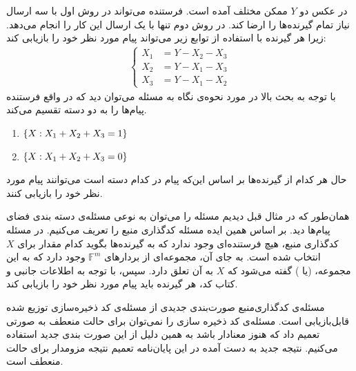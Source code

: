 \begin{example}
\begin{minipage}{0.5\textwidth}
	\end{minipage}
	\newline
	 در عکس دو $Y$ ممکن مختلف آمده است. فرستنده می‌تواند در روش اول با سه ارسال نیاز تمام گیرنده‌ها را ارضا کند. در روش دوم تنها با یک ارسال این کار را انجام می‌دهد. زیرا هر گیرنده با استفاده از توابع زیر می‌تواند پیام مورد نظر خود را بازیابی کند:
	\begin{align*}
		\begin{cases}
				X_1 &= Y - X_2 - X_3 \\
				X_2 &= Y - X_1 - X_3  \\
				X_3 &= Y - X_1 - X_2  
			\end{cases}   
	\end{align*}
	با توجه به بحث بالا در مورد نحوه‌ی نگاه به مسئله می‌توان دید که در واقع فرستنده پیام‌ها را به دو دسته تقسیم می‌کند.
		\begin{enumerate}
			\centering
			\item $\left\{ X: X_1 + X_2 + X_3 = 1 \right\}$
			\item $\left\{ X: X_1 + X_2 + X_3 = 0 \right\}$
		\end{enumerate}
	حال هر کدام از گیرنده‌ها بر اساس این‌که پیام در کدام دسته است می‌توانند پیام مورد نظر خود را بازیابی کنند.
\end{example}

همان‌طور که در مثال قبل دیدیم مسئله 
\icod
 را می‌توان به نوعی مسئله‌ی دسته بندی فضای پیام‌ها دید. بر اساس همین ایده مسئله کدگذاری منبع را تعریف می‌کنیم. در مسئله کدگذاری منبع، هیچ فرستنده‌ای وجود ندارد که به گیرنده‌ها بگوید کدام مقدار برای $X$ انتخاب شده است. به جای آن، مجموعه‌ای از بردارهای
  $\mathbb{F}^m$
   وجود دارد که به این مجموعه،
 (یا 
 )
 گفته می‌شود که $X$ به آن تعلق دارد. سپس، با توجه به اطلاعات جانبی و کتاب کد، هر گیرنده باید پیام مورد نظر خود را بازیابی کند.
\begin{observation}
	مسئله‌ی کدگذاری‌منبع صورت‌بندی جدیدی از مسئله‌ی کد ذخیره‌سازی توزیع شده قابل‌بازیابی است. مسئله‌ی کد ذخیره سازی را نمی‌توان برای حالت منعطف به صورتی تعمیم داد که هنوز معنادار باشد به همین دلیل از این صورت بندی جدید استفاده می‌کنیم. نتیجه جدید به دست آمده در این پایان‌نامه تعمیم نتیجه مزومدار برای حالت منعطف است.
\end{observation}

